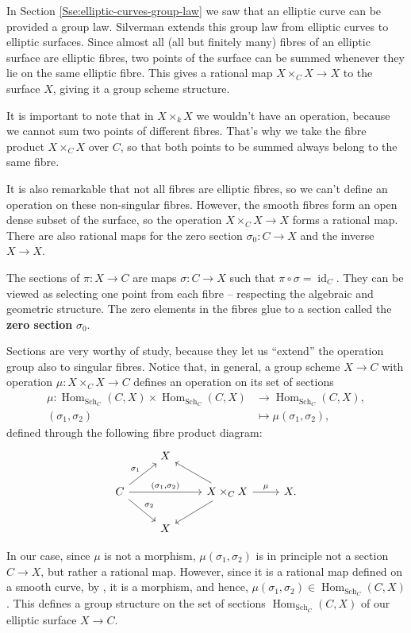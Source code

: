 \documentclass{report}
\DeclareMathOperator{\id}{id}
\DeclareMathOperator{\Hom}{Hom}
\DeclareMathOperator{\Sch}{Sch}
\theoremstyle{definition}
\begin{document}
In Section \ref{Sse:elliptic-curves-group-law} we saw that an elliptic curve can be provided a group law. Silverman \cite[Section~III.3]{silverman1994advanced} extends this group law from elliptic curves to elliptic surfaces. Since almost all (all but finitely many) fibres of an elliptic surface are elliptic fibres, two points of the surface can be summed whenever they lie on the same elliptic fibre. This gives a rational map $X\times_CX\rightarrow X$ to the surface $X$, giving it a group scheme structure.

It is important to note that in $X\times_kX$ we wouldn't have an operation, because we cannot sum two points of different fibres. That's why we take the fibre product $X\times_CX$ over $C$, so that both points to be summed always belong to the same fibre.

It is also remarkable that not all fibres are elliptic fibres, so we can't define an operation on these non-singular fibres. However, the smooth fibres form an open dense subset of the surface, so the operation $X\times_CX\rightarrow X$ forms a rational map. There are also rational maps for the zero section $\sigma_0:C\rightarrow X$ and the inverse $X\rightarrow X$.

The sections of $\pi:X\rightarrow C$ are maps $\sigma:C\rightarrow X$ such that $\pi\circ\sigma=\id_C$. They can be viewed as selecting one point from each fibre -- respecting the algebraic and geometric structure. The zero elements in the fibres glue to a section called the \textbf{zero section} $\sigma_0$.

Sections are very worthy of study, because they let us ``extend'' the operation group also to singular fibres. Notice that, in general, a group scheme $X\rightarrow C$ with operation $\mu:X\times_CX\rightarrow C$ defines an operation on its set of sections
\begin{align*}
\mu:\Hom_{\Sch_C}(C,X)\times\Hom_{\Sch_C}(C,X)&\longrightarrow\Hom_{\Sch_C}(C,X),\\
(\sigma_1,\sigma_2)&\longmapsto\mu(\sigma_1,\sigma_2),
\end{align*}
defined through the following fibre product diagram:
\[
\begin{tikzcd}
&X\\
C\arrow[ru,"\sigma_1"]\arrow[rd,"\sigma_2"]\arrow[rr,"{(\sigma_1,\sigma_2)}"]&&X\times_CX\arrow[lu]\arrow[ld]\arrow[r,"\mu"]&X.\\
&X
\end{tikzcd}
\]

In our case, since $\mu$ is not a morphism, $\mu(\sigma_1,\sigma_2)$ is in principle not a section $C\rightarrow X$, but rather a rational map. However, since it is a rational map defined on a smooth curve, by \cite[Proposition~II.2.1]{silverman1986arithmetic}, it is a morphism, and hence, $\mu(\sigma_1,\sigma_2)\in\Hom_{\Sch_C}(C,X)$. This defines a group structure on the set of sections $\Hom_{\Sch_C}(C,X)$ of our elliptic surface $X\rightarrow C$.
\end{document}
